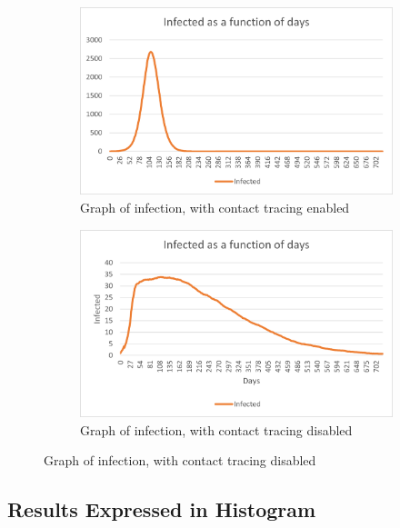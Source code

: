 \begin{figure}[H]
  \centering
  
  \begin{subfigure}{.45\textwidth}
    \centering
    \includegraphics[width=.95\linewidth]{0_billeder/covidInfectionGraphA.png}
    \caption{Graph of infection, with contact tracing enabled}
    \label{Subfig:covidInfGraphA}
  \end{subfigure}
  
  \begin{subfigure}{.45\textwidth}
    \centering
    \includegraphics[width=.95\linewidth]{0_billeder/covidInfectionGraphB.png.png}
    \caption{Graph of infection, with contact tracing disabled}
    \label{Subfig:covidInfGraphB}
  \end{subfigure}
  \label{Fig:covidInfGraphs}
  
\end{figure}



\subsection{Results Expressed in Histogram}





%


